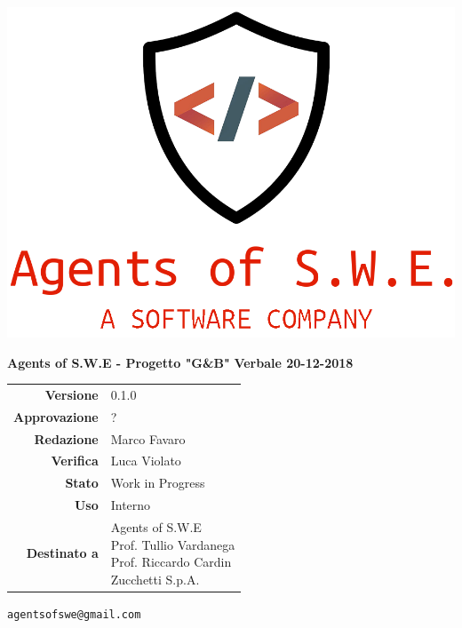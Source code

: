 


\begin{titlepage}
\thispagestyle{empty}

\begin{center}

\includegraphics[scale=0.3]{./images/logo.png} 




\large \textbf{Agents of S.W.E - Progetto "G\&B"}
\vfill
\Huge \textbf{Verbale 20-12-2018}
\vfill
\large
\renewcommand{\arraystretch}{1.3}
\begin{tabular}{r|l}
\textbf{Versione} & 0.1.0\\
\textbf{Approvazione} & ?\\
\textbf{Redazione} & \parbox[t]{5cm}{Marco Favaro}\\
\textbf{Verifica} & \parbox[t]{5cm}{Luca Violato}\\
\textbf{Stato} & Work in Progress\\
\textbf{Uso} & Interno\\
\textbf{Destinato a} & \parbox[t]{5cm}{Agents of S.W.E \\Prof. Tullio Vardanega\\Prof. Riccardo Cardin\\Zucchetti S.p.A.}
\end{tabular}
\vfill
\small
\texttt{agentsofswe@gmail.com}
\end{center}
\end{titlepage}

\pagebreak



	











